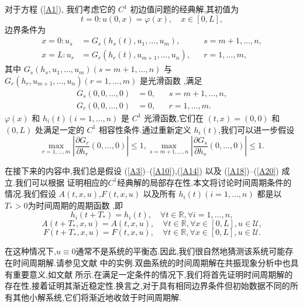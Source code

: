 \documentclass[notitlepage,cs4size,punct,oneside]{ctexrep}
\numberwithin{equation}{chapter}
\theoremstyle{mystyle}
\begin{document}
对于方程 (\ref{A1}), 我们考虑它的 $C^{1}$ 初边值问题的经典解,其初值为
\begin{equation}\label{A15}
    t=0: u(0, x)=\varphi(x), \quad x \in[0, L],
\end{equation}
边界条件为
\begin{align}
    x=0: u_{s} & =G_{s}\left(h_{s}(t), u_{1}, \ldots, u_{m}\right),   &  & s=m+1, \ldots, n, \label{A16} \\
    x=L: u_{r} & =G_{r}\left(h_{r}(t), u_{m+1}, \ldots, u_{n}\right), &  & r=1, \ldots, m,\label{A17}
\end{align}
其中 $G_{s}\left(h_{s}, u_{1}, \ldots, u_{m}\right)(s=m+1, \ldots, n)$ 与 $G_{r}\left(h_{r}, u_{m+1}, \ldots, u_{n}\right)(r=1, \ldots, m)$ 是光滑函数 ,满足
\begin{align}
    G_{s}(0,0, \ldots, 0) & =0, &  & s=m+1, \ldots, n, \label{A18} \\
    G_{r}(0,0, \ldots, 0) & =0, &  & r=1, \ldots, m .\label{A19}
\end{align}
$\varphi(x)$ 和 $h_{i}(t) (i = 1, \ldots, n)$ 是 $C^{1}$ 光滑函数,它们在 $(t, x) = (0, 0)$ 和 $(0, L)$ 处满足一定的 $C^{1}$ 相容性条件.通过重新定义 $h_{i}(t)$,我们可以进一步假设
\begin{equation}\label{A20}
    \max _{r=1, \ldots, m}\left|\frac{\partial G_{r}}{\partial h_{r}}(0, \ldots, 0)\right| \leq 1, \max _{s=m+1, \ldots, n}\left|\frac{\partial G_{s}}{\partial h_{s}}(0, \ldots, 0)\right| \leq 1.
\end{equation}

在接下来的内容中,我们总是假设 (\ref{A3})--(\ref{A10}),(\ref{A14}) 以及 (\ref{A18})--(\ref{A20}) 成立.我们可以根据 \cite{15} 证明相应的$C^{1}$经典解的局部存在性.本文将讨论时间周期条件的情况.我们假设 $A(t, x, u)$,$F(t, x, u)$ 以及所有 $h_{i}(t) (i = 1, \ldots, n)$ 都是以$T_{*} > 0$为时间周期的周期函数 ,即
\begin{equation}\label{A21}
    h_{i}\left(t+T_{*}\right)=h_{i}(t), \quad \forall t \in \mathbb{R}, \forall i=1, \ldots, n,
\end{equation}
\begin{equation}\label{A22}
    A(t+T_{*},x,u)=A(t,x,u), \quad \forall t \in \mathbb{R}, \forall x \in [0,L],u \in \mathcal{U},
\end{equation}
\begin{equation}\label{A23}
    F(t+T_{*},x,u)=F(t,x,u), \quad \forall t \in \mathbb{R}, \forall x \in [0,L],u \in \mathcal{U}.
\end{equation}

在这种情况下,$u \equiv 0$通常不是系统的平衡态.因此,我们很自然地猜测该系统可能存在时间周期解.请参见文献 \cite{22} 中的实例.双曲系统的时间周期解在共振现象分析中也具有重要意义,如文献 \cite{17, 19} 所示.在满足一定条件的情况下,我们将首先证明时间周期解的存在性,接着证明其渐近稳定性.换言之,对于具有相同边界条件但初始数据不同的所有其他小解系统,它们将渐近地收敛于时间周期解.
\end{document}
